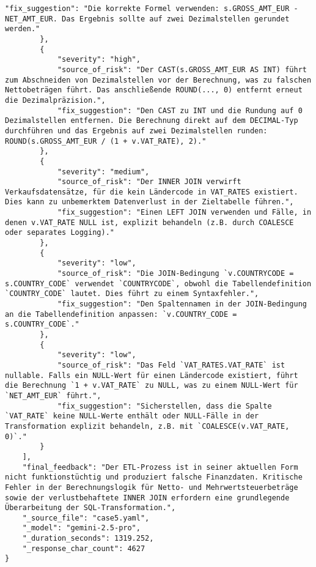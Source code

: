 \begin{lstlisting}[caption={Ausgabe: GEMINI 2.5 Pro Anwendungsfall 5 Hauptdurchlauf},label={gemini_case5_prompt1}]
            "fix_suggestion": "Die korrekte Formel verwenden: s.GROSS_AMT_EUR - NET_AMT_EUR. Das Ergebnis sollte auf zwei Dezimalstellen gerundet werden."
        },
        {
            "severity": "high",
            "source_of_risk": "Der CAST(s.GROSS_AMT_EUR AS INT) führt zum Abschneiden von Dezimalstellen vor der Berechnung, was zu falschen Nettobeträgen führt. Das anschließende ROUND(..., 0) entfernt erneut die Dezimalpräzision.",
            "fix_suggestion": "Den CAST zu INT und die Rundung auf 0 Dezimalstellen entfernen. Die Berechnung direkt auf dem DECIMAL-Typ durchführen und das Ergebnis auf zwei Dezimalstellen runden: ROUND(s.GROSS_AMT_EUR / (1 + v.VAT_RATE), 2)."
        },
        {
            "severity": "medium",
            "source_of_risk": "Der INNER JOIN verwirft Verkaufsdatensätze, für die kein Ländercode in VAT_RATES existiert. Dies kann zu unbemerktem Datenverlust in der Zieltabelle führen.",
            "fix_suggestion": "Einen LEFT JOIN verwenden und Fälle, in denen v.VAT_RATE NULL ist, explizit behandeln (z.B. durch COALESCE oder separates Logging)."
        },
        {
            "severity": "low",
            "source_of_risk": "Die JOIN-Bedingung `v.COUNTRYCODE = s.COUNTRY_CODE` verwendet `COUNTRYCODE`, obwohl die Tabellendefinition `COUNTRY_CODE` lautet. Dies führt zu einem Syntaxfehler.",
            "fix_suggestion": "Den Spaltennamen in der JOIN-Bedingung an die Tabellendefinition anpassen: `v.COUNTRY_CODE = s.COUNTRY_CODE`."
        },
        {
            "severity": "low",
            "source_of_risk": "Das Feld `VAT_RATES.VAT_RATE` ist nullable. Falls ein NULL-Wert für einen Ländercode existiert, führt die Berechnung `1 + v.VAT_RATE` zu NULL, was zu einem NULL-Wert für `NET_AMT_EUR` führt.",
            "fix_suggestion": "Sicherstellen, dass die Spalte `VAT_RATE` keine NULL-Werte enthält oder NULL-Fälle in der Transformation explizit behandeln, z.B. mit `COALESCE(v.VAT_RATE, 0)`."
        }
    ],
    "final_feedback": "Der ETL-Prozess ist in seiner aktuellen Form nicht funktionstüchtig und produziert falsche Finanzdaten. Kritische Fehler in der Berechnungslogik für Netto- und Mehrwertsteuerbeträge sowie der verlustbehaftete INNER JOIN erfordern eine grundlegende Überarbeitung der SQL-Transformation.",
    "_source_file": "case5.yaml",
    "_model": "gemini-2.5-pro",
    "_duration_seconds": 1319.252,
    "_response_char_count": 4627
}
\end{lstlisting}

